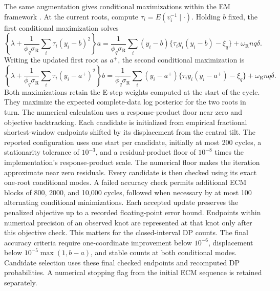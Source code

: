 \documentclass[11pt]{article}
\begin{document}
The same augmentation gives conditional maximizations within the EM framework
\citep{DempsterLairdRubin1977EM,MengRubin1993ECM}.
At the current roots, compute \(\tau_i=E(v_i^{-1}\mid\cdot)\). Holding
\(b\) fixed, the first conditional maximization solves
\[
\left\{\lambda+\frac{1}{\phi_q\sigma_{\mathrm R}}
\sum_i\tau_i(y_i-b)^2\right\}a
=\frac{1}{\phi_q\sigma_{\mathrm R}}
\sum_i(y_i-b)\{\tau_i y_i(y_i-b)-\xi_q\}
+\omega_{\mathrm R}nq\delta.
\]
Writing the updated first root as \(a^+\), the second conditional
maximization is
\[
\left\{\lambda+\frac{1}{\phi_q\sigma_{\mathrm R}}
\sum_i\tau_i(y_i-a^+)^2\right\}b
=\frac{1}{\phi_q\sigma_{\mathrm R}}
\sum_i(y_i-a^+)\{\tau_i y_i(y_i-a^+)-\xi_q\}
+\omega_{\mathrm R}nq\delta.
\]
Both maximizations retain the E-step weights computed at the start of the
cycle. They maximize the expected complete-data log posterior for the two
roots in turn. The numerical calculation
uses a response-product floor near zero and objective backtracking.
Each candidate is initialized from empirical fractional shortest-window
endpoints shifted by its displacement from the central tilt. The reported
configuration uses one start per candidate, initially at most 200 cycles, a stationarity
tolerance of \(10^{-3}\), and a residual-product floor of \(10^{-8}\) times
the implementation's response-product scale. The numerical floor makes the
iteration approximate near zero residuals.
Every candidate is then checked using its exact one-root conditional modes.
A failed accuracy check permits additional ECM blocks of 800, 2000, and
10,000 cycles, followed when necessary by at most 100 alternating conditional
minimizations. Each accepted update preserves the penalized objective up to
a recorded floating-point error bound. Endpoints within numerical precision
of an observed knot are represented at that knot only after this objective
check. This matters for the closed-interval DP counts.
The final accuracy criteria require one-coordinate improvement below
\(10^{-6}\), displacement below \(10^{-5}\max(1,b-a)\), and stable counts
at both conditional modes. Candidate selection uses these final checked
endpoints and recomputed DP probabilities. A numerical stopping flag from
the initial ECM sequence is retained separately.
\end{document}
